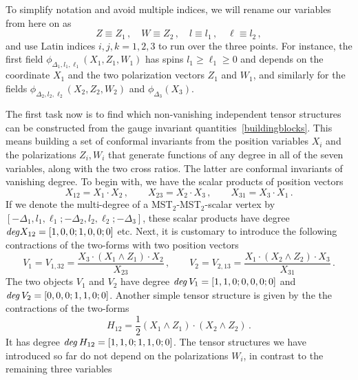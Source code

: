 \documentclass{article}
\begin{document}
To simplify notation and avoid multiple indices, we will rename our 
variables from here on as
\begin{equation}
    Z\equiv Z_1\,, \quad W\equiv Z_2\,, \quad l\equiv l_1\,, \quad \ell \equiv l_2\,,
\end{equation}
and use Latin indices $i,j,k=1,2,3$ to run over the three points. For instance, the 
first field $\phi_{\Delta_1,l_1,\ell_1}(X_1,Z_1,W_1)$ has spins $l_1 \geq \ell_1 
\geq 0$ and depends on the coordinate $X_1$ and the two polarization vectors $Z_1$ and 
$W_1$, and similarly for the fields $\phi_{\Delta_2,l_2,\ell_2}(X_2,Z_2,W_2)$ 
and $\phi_{\Delta_3}(X_3)$.

The first task now is to find which non-vanishing independent tensor structures 
can be constructed from the gauge invariant quantities~\eqref{buildingblocks}. This means building a set of conformal invariants from the position variables $X_i$ and the 
polarizations $Z_i,W_i$ that generate functions of any degree in all 
of the seven variables, along with the two cross ratios. The latter are conformal invariants 
of vanishing degree. To begin with, we have the scalar products of position vectors
\begin{equation} 
    X_{12}=X_1\cdot X_2\,, \qquad X_{23}=X_2\cdot X_3\,, \qquad X_{31}=X_3\cdot X_1\,.
    \label{scalarproducts}
\end{equation}
If we denote the multi-degree of a MST$_2$-MST$_2$-scalar vertex by 
$[-\Delta_1,l_1,\ell_1;-\Delta_2,l_2,\ell_2;-\Delta_3]$, these scalar products have degree 
$\textit{deg\/}X_{12}=[1,0,0;1,0,0;0]$ etc. Next, it is customary to introduce the following 
contractions of the two-forms with two position vectors
\begin{equation} \label{eq:Vdef} 
    V_1=V_{1,32}=\frac{X_3\cdot\left(X_1\wedge Z_1\right)\cdot X_2}{X_{23}}\,, 
    \qquad V_2=V_{2,13}=\frac{X_1\cdot\left(X_2\wedge Z_2\right)\cdot X_3}{X_{31}}\,. 
\end{equation}
The two objects $V_1$ and $V_2$ have degree $\textit{deg\/}\,V_1 = [1,1,0;0,0,0;0]$ and 
$\textit{deg\/}\,V_2 = [0,0,0;1,1,0;0]$. Another simple tensor structure is given by the 
the contractions of the two-forms
\begin{equation} \label{eq:Hdef} 
    H_{12}=\frac{1}{2}(X_1\wedge Z_1)\cdot(X_2\wedge Z_2)\,. 
\end{equation}
It has degree $\textit{deg\/}\, H_{12} = [1,1,0;1,1,0;0]$. The tensor structures we have introduced 
so far do not depend on the polarizations $W_i$, in contrast to the remaining three variables
\end{document}
